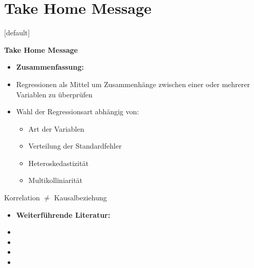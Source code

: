 \documentclass[aspectratio=169, journal, x11names, unknownkeysallowed, hyperref={colorlinks,
linkcolor = SS2,
urlcolor  = F3,
citecolor = F3,
anchorcolor = A4}, 12pt]{beamer}
\begin{document}
\section{Take Home Message}
[default]
\thispagestyle{empty}
\begin{frame} 
\begin{center}
\textcolor{SS2}{\huge{\textbf{Take Home Message}}}
\end{center}
\end{frame}

    \begin{frame}[t]
      \begin{minipage}[t]{0.45\textwidth}
        \begin{itemize}
            \item[] \textbf{Zusammenfassung:}
            \item Regressionen als Mittel um Zusammenhänge zwischen einer oder mehrerer Variablen zu überprüfen
            \item Wahl der Regressionsart abhängig von:
            \begin{itemize}
              \footnotesize
              \item Art der Variablen
              \item Verteilung der Standardfehler
              \item Heteroskedastizität
              \item Multikolliniarität
            \end{itemize}
        \end{itemize}
        \scriptsize
        \begin{tcolorbox}[title=Achtung!, colframe=red!80!black, colback=orange!25]
          \centering
          Korrelation $\neq$ Kausalbeziehung
        \end{tcolorbox}
      \end{minipage}%
      \begin{minipage}[t]{0.45\textwidth}
        \begin{itemize}
          \item[] \textbf{Weiterführende Literatur:}
          \scriptsize  
          \item {} 
          \item {}
          \item {}
          \item {}
        \end{itemize}
      \end{minipage}
    \end{frame}
\end{document}

